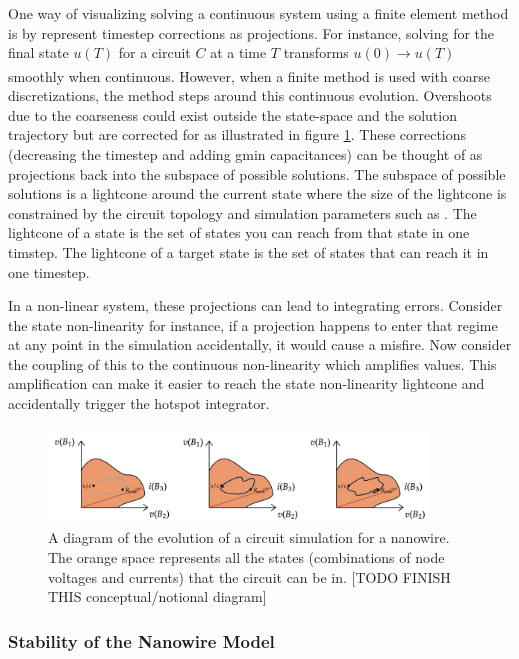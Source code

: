 One way of visualizing solving a continuous system using a finite element method is by
represent timestep corrections
as projections. For instance, solving for the final state $u(T)$ for a circuit $C$ at a time $T$ 
transforms $u(0)\xrightarrow[]{} u(T)$ smoothly when continuous. However, when a finite method is used
with coarse discretizations, the method steps around this continuous evolution. Overshoots due to the
coarseness could exist outside the state-space and the solution trajectory but are corrected for
as illustrated in figure \ref{fig:statespaceevolution}. 
These corrections (decreasing the timestep and adding gmin capacitances) can be thought of as projections
back into the subspace of possible solutions. The subspace of possible solutions is
a lightcone around the current state where the size of the lightcone is constrained
by the circuit topology and simulation parameters such as . The lightcone
of a state is the set of states you can reach from that state in one timstep. The
lightcone of a target state is the set of states that can reach it in one timestep.

In a non-linear system, these projections can lead to integrating errors. Consider the
state non-linearity for instance, if a projection happens to enter that regime at any
point in the simulation accidentally, it would cause a misfire. Now consider the coupling
of this to the continuous non-linearity which amplifies values. This amplification can
make it easier to reach the state non-linearity lightcone and accidentally trigger
the hotspot integrator.

\begin{figure}
    \centering
    \includegraphics[width=0.9\textwidth]{figs/statespaceevolution.png}
    \caption{A diagram of the evolution of a circuit simulation for a nanowire.
    The orange space represents all the states (combinations of node voltages and currents) 
    that the circuit can be in. [TODO FINISH THIS conceptual/notional diagram]}
    \label{fig:statespaceevolution}
\end{figure}

\subsubsection{Stability of the Nanowire Model} 

